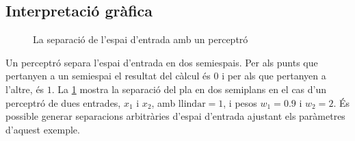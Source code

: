 \begin{refsection}
\begin{comment}
			\foreach \l [count=\i] in {1,2,3,n}
			\draw [<-] (input-\i) -- ++(-1,0)
			node [above, midway] {$I_\l$};

			\foreach \l [count=\i] in {1,n}
			\node [above] at (hidden-\i.north) {$H_\l$};

			\foreach \l [count=\i] in {1,n}
			\draw [->] (output-\i) -- ++(1,0)
			node [above, midway] {$O_\l$};

			\foreach \i in {1,...,4}
			\foreach \j in {1,...,2}
			\draw [->] (input-\i) -- (hidden-\j);

			\foreach \i in {1,...,2}
			\foreach \j in {1,...,2}
			\draw [->] (hidden-\i) -- (output-\j);

			\foreach \l [count=\x from 0] in {Input, Hidden, Ouput}
			\node [align=center, above] at (\x*2,2) {\l \\ layer};

		\end{tikzpicture}
		\caption{Example of a parametric plot ($\sin (x), \cos(x), x$)}
	\end{figure}
	\end{comment}

	\subsection{Interpretació gràfica}
	
	\begin{figure}[H]
		\centering
		\caption{La separació de l'espai d'entrada amb un perceptró}
		\label{fig:separation}
	\end{figure}
	
	Un perceptró separa l'espai d'entrada en dos semiespais. Per als punts que pertanyen a un semiespai el resultat del càlcul és $0$ i per als que pertanyen a l'altre, és $1$. La \cref{fig:separation} mostra la separació del pla en dos semiplans en el cas d'un perceptró de dues entrades, $x_1$ i $x_2$, amb $\mathrm{llindar}=1$, i pesos $w_1=0.9$ i $w_2=2$. És possible generar separacions arbitràries d'espai d'entrada ajustant els paràmetres d'aquest exemple.\supercite{Rojas1996}
	

\end{refsection}
